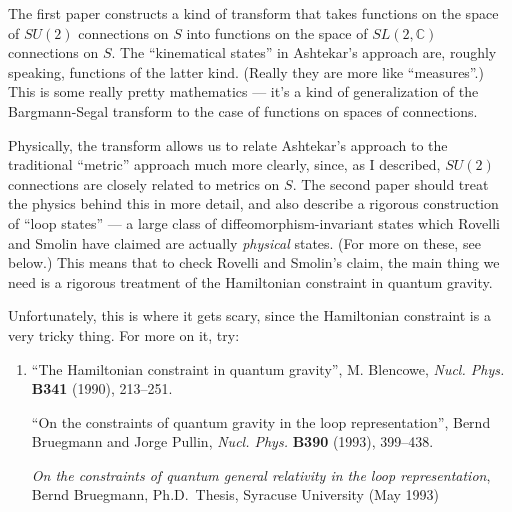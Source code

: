 \documentclass{article}
\renewcommand{\texttt}[1]{%
  \begingroup
  \ttfamily
  \begingroup\lccode`~=`/\lowercase{\endgroup\def~}{/\discretionary{}{}{}}%
  \begingroup\lccode`~=`[\lowercase{\endgroup\def~}{[\discretionary{}{}{}}%
  \begingroup\lccode`~=`.\lowercase{\endgroup\def~}{.\discretionary{}{}{}}%
  \catcode`/=\active\catcode`[=\active\catcode`.=\active
  \scantokens{#1\noexpand}%
  \endgroup
}
\begin{document}

The first paper constructs a kind of transform that takes functions on
the space of \(SU(2)\) connections on \(S\) into functions on the space
of \(SL(2,\mathbb{C})\) connections on \(S\). The ``kinematical states''
in Ashtekar's approach are, roughly speaking, functions of the latter
kind. (Really they are more like ``measures''.) This is some really
pretty mathematics --- it's a kind of generalization of the
Bargmann-Segal transform to the case of functions on spaces of
connections.

Physically, the transform allows us to relate Ashtekar's approach to the
traditional ``metric'' approach much more clearly, since, as I
described, \(SU(2)\) connections are closely related to metrics on
\(S\). The second paper should treat the physics behind this in more
detail, and also describe a rigorous construction of ``loop states'' ---
a large class of diffeomorphism-invariant states which Rovelli and
Smolin have claimed are actually \emph{physical} states. (For more on
these, see below.) This means that to check Rovelli and Smolin's claim,
the main thing we need is a rigorous treatment of the Hamiltonian
constraint in quantum gravity.

Unfortunately, this is where it gets scary, since the Hamiltonian
constraint is a very tricky thing. For more on it, try:

\begin{enumerate}
\def\labelenumi{\arabic{enumi})}
\setcounter{enumi}{2}
\item
  ``The Hamiltonian constraint in quantum gravity'', M. Blencowe,
  \emph{Nucl. Phys.} \textbf{B341} (1990), 213--251.

  ``On the constraints of quantum gravity in the loop representation'',
  Bernd Bruegmann and Jorge Pullin, \emph{Nucl. Phys.} \textbf{B390}
  (1993), 399--438.

  \emph{On the constraints of quantum general relativity in the loop
  representation}, Bernd Bruegmann, Ph.D.~Thesis, Syracuse University
  (May 1993)
\end{enumerate}
\end{document}
